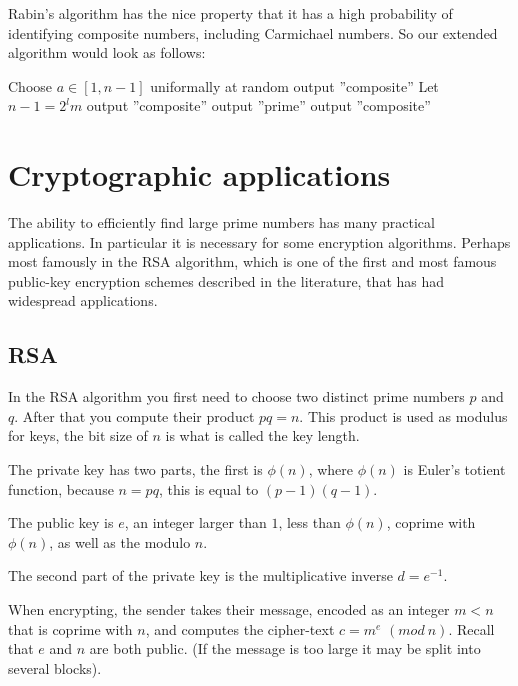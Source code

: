 \documentclass[12pt]{report}
\begin{document}
Rabin's algorithm has the nice property that it has a high probability of identifying composite numbers, including Carmichael numbers. So our extended algorithm would look as follows:


\begin{algorithmic}
    \State Choose $a \in [1,n-1]$ uniformally at random
      \State output ''composite''
    \Else
        \State Let $n-1 = 2^lm$
            \State output ''composite''
          \EndIf
        \EndFor
        \State output ''prime''
      \Else
        \State output ''composite''
      \EndIf
    \EndIf
  \EndFunction
\end{algorithmic}



\newpage
\section*{Cryptographic applications}

The ability to efficiently find large prime numbers has many practical applications. In particular it is necessary for some encryption algorithms. Perhaps most famously in the RSA algorithm, which is one of the first and most famous public-key encryption schemes described in the literature, that has had widespread applications.

\subsection*{RSA}

In the RSA algorithm \cite{RIVEST} you first need to choose two distinct prime numbers $p$ and $q$. After that you compute their product $pq = n$. This product is used as modulus for keys, the bit size of $n$ is what is called the key length.

The private key has two parts, the first is $\phi(n)$, where $\phi(n)$ is Euler's totient function, because $n = pq$, this is equal to $(p-1)(q-1)$. 

The public key is $e$, an integer larger than $1$, less than $\phi(n)$, coprime with $\phi(n)$, as well as the modulo $n$.

The second part of the private key is the multiplicative inverse $d = e^{-1}$.

When encrypting, the sender takes their message, encoded as an integer $m < n$ that is coprime with $n$, and computes the cipher-text $c = m^e$ $(mod\ n)$. Recall that $e$ and $n$ are both public. (If the message is too large it may be split into several blocks).
\end{document}
